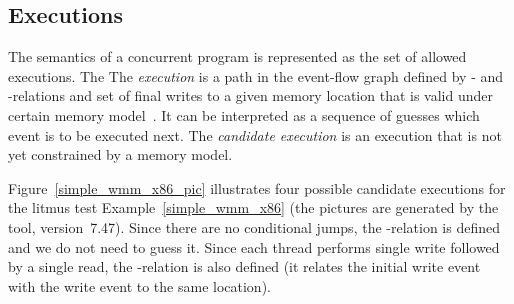 

\subsection{Executions}
\label{ch:wmm:model:executions}

The semantics of a concurrent program is represented as the set of allowed executions. The 
The \textit{execution} is a path in the event-flow graph defined by \po- and \rf-relations and set of final writes to a given memory location that is valid under certain memory model~\cite{alglave2014herding}.
It can be interpreted as a sequence of guesses which event is to be executed next.
The \textit{candidate execution} is an execution that is not yet constrained by a memory model.


Figure~\ref{simple_wmm_x86_pic} illustrates four possible candidate executions for the litmus test Example~\ref{simple_wmm_x86} (the pictures are generated by the  tool, version~7.47).
Since there are no conditional jumps, the \po-relation is defined and we do not need to guess it.
Since each thread performs single write followed by a single read, the \co-relation is also defined (it relates the initial write event with the write event to the same location).

